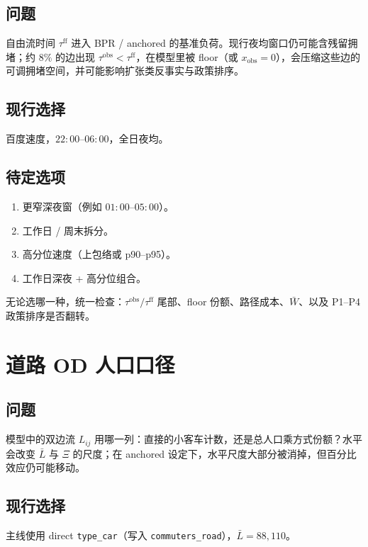 \documentclass[11pt,a4paper]{article}
\begin{document}
\subsection*{问题}
自由流时间 $\tau^{\mathrm{ff}}$ 进入 BPR / anchored 的基准负荷。现行夜均窗口仍可能含残留拥堵；约 $8\%$ 的边出现 $\tau^{\mathrm{obs}}<\tau^{\mathrm{ff}}$，在模型里被 floor（或 $x_{\mathrm{obs}}=0$），会压缩这些边的可调拥堵空间，并可能影响扩张类反事实与政策排序。

\subsection*{现行选择}
百度速度，$22{:}00$--$06{:}00$，全日夜均。

\subsection*{待定选项}
\begin{enumerate}[nosep]
  \item 更窄深夜窗（例如 $01{:}00$--$05{:}00$）。
  \item 工作日 / 周末拆分。
  \item 高分位速度（上包络或 p90--p95）。
  \item 工作日深夜 + 高分位组合。
\end{enumerate}
无论选哪一种，统一检查：$\tau^{\mathrm{obs}}/\tau^{\mathrm{ff}}$ 尾部、floor 份额、路径成本、$\bar W$、以及 P1--P4 政策排序是否翻转。

\section{道路 OD 人口口径}

\subsection*{问题}
模型中的双边流 $L_{ij}$ 用哪一列：直接的小客车计数，还是总人口乘方式份额？水平会改变 $\bar L$ 与 $\Xi$ 的尺度；在 anchored 设定下，水平尺度大部分被消掉，但百分比效应仍可能移动。

\subsection*{现行选择}
主线使用 direct \texttt{type\_car}（写入 \texttt{commuters\_road}），$\bar L=88{,}110$。
\end{document}
